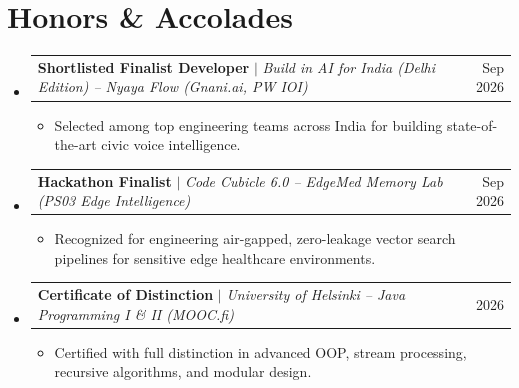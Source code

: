 \documentclass[letterpaper,10pt]{article}
\makeatletter
\newcommand{\resumeItem}[1]{
  \item\small{
    {#1 \vspace{-2pt}}
  }
}
\newcommand{\resumeProjectHeading}[2]{
    \item
    \begin{tabular*}{0.97\textwidth}{l@{\extracolsep{\fill}}r}
      \small#1 & #2 \\
    \end{tabular*}\vspace{-5pt}
}
\newcommand{\resumeSubHeadingListStart}{\begin{itemize}[leftmargin=0.15in, label={}]}
\newcommand{\resumeSubHeadingListEnd}{\end{itemize}}
\newcommand{\resumeItemListStart}{\begin{itemize}}
\newcommand{\resumeItemListEnd}{\end{itemize}\vspace{-5pt}}
\makeatother
\begin{document}
\section{Honors \& Accolades}
    \resumeSubHeadingListStart
      \resumeProjectHeading
          {\textbf{Shortlisted Finalist Developer} $|$ \emph{Build in AI for India (Delhi Edition) -- Nyaya Flow (Gnani.ai, PW IOI)}}{Sep 2026}
          \resumeItemListStart
            \resumeItem{Selected among top engineering teams across India for building state-of-the-art civic voice intelligence.}
          \resumeItemListEnd
      \resumeProjectHeading
          {\textbf{Hackathon Finalist} $|$ \emph{Code Cubicle 6.0 -- EdgeMed Memory Lab (PS03 Edge Intelligence)}}{Sep 2026}
          \resumeItemListStart
            \resumeItem{Recognized for engineering air-gapped, zero-leakage vector search pipelines for sensitive edge healthcare environments.}
          \resumeItemListEnd
      \resumeProjectHeading
          {\textbf{Certificate of Distinction} $|$ \emph{University of Helsinki -- Java Programming I \& II (MOOC.fi)}}{2026}
          \resumeItemListStart
            \resumeItem{Certified with full distinction in advanced OOP, stream processing, recursive algorithms, and modular design.}
          \resumeItemListEnd
    \resumeSubHeadingListEnd

\end{document}
